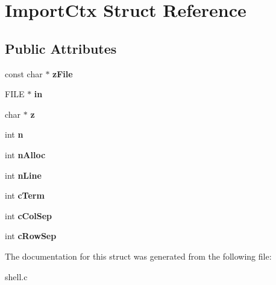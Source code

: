 \hypertarget{structImportCtx}{}\section{Import\+Ctx Struct Reference}
\label{structImportCtx}
\subsection*{Public Attributes}
\begin{DoxyCompactItemize}
\item 
const char $\ast$ {\bfseries z\+File}\hypertarget{structImportCtx_a88414dab6838f62acc8dbb3d2afe299d}{}\label{structImportCtx_a88414dab6838f62acc8dbb3d2afe299d}

\item 
F\+I\+LE $\ast$ {\bfseries in}\hypertarget{structImportCtx_a63c21cba47680ddd0c842866ab5486e5}{}\label{structImportCtx_a63c21cba47680ddd0c842866ab5486e5}

\item 
char $\ast$ {\bfseries z}\hypertarget{structImportCtx_ade5d138b0f146f8bed3e83bfbb450f2e}{}\label{structImportCtx_ade5d138b0f146f8bed3e83bfbb450f2e}

\item 
int {\bfseries n}\hypertarget{structImportCtx_a93c89715a8ced4d28b9dcb29a083f748}{}\label{structImportCtx_a93c89715a8ced4d28b9dcb29a083f748}

\item 
int {\bfseries n\+Alloc}\hypertarget{structImportCtx_a04606938856e8071c34af5c68607734b}{}\label{structImportCtx_a04606938856e8071c34af5c68607734b}

\item 
int {\bfseries n\+Line}\hypertarget{structImportCtx_a7b910b2b078d291e84ad333792efb000}{}\label{structImportCtx_a7b910b2b078d291e84ad333792efb000}

\item 
int {\bfseries c\+Term}\hypertarget{structImportCtx_a32c66d4ff064ed9d5775ec6a0bab66ba}{}\label{structImportCtx_a32c66d4ff064ed9d5775ec6a0bab66ba}

\item 
int {\bfseries c\+Col\+Sep}\hypertarget{structImportCtx_a5c5dc07e3bd063d2da26da4a83f46576}{}\label{structImportCtx_a5c5dc07e3bd063d2da26da4a83f46576}

\item 
int {\bfseries c\+Row\+Sep}\hypertarget{structImportCtx_a9b23999b41777a9726b91ec61b74f21a}{}\label{structImportCtx_a9b23999b41777a9726b91ec61b74f21a}

\end{DoxyCompactItemize}


The documentation for this struct was generated from the following file\+:\begin{DoxyCompactItemize}
\item 
shell.\+c\end{DoxyCompactItemize}
